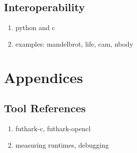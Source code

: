 \documentclass[11pt]{book}
\begin{document}
\chapter{Interoperability}
\label{chap:interoperability}

\begin{enumerate}
\item python and c
\item examples: mandelbrot, life, cam, nbody
\end{enumerate}




\appendix

\part{Appendices}

\chapter{Tool References}
\begin{enumerate}
\item futhark-c, futhark-opencl
\item measuring runtimes, debugging
\end{enumerate}
\end{document}
